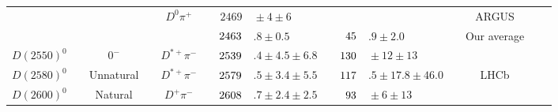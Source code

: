 \begin{adjustbox}{width=0.76\textwidth,center}
{\begin{tabular}{cp{5pt}cp{5pt}cp{5pt}r@{}lp{5pt}r@{}lp{5pt}cp{5pt}c}
		                                         &                  &                              &                  & $D^{0}\pi^{+}$                  &                       & $	2469$                       & ${}\pm4\pm6	$                                 &                       &                                                  &                                              &                       & ARGUS                                                         &                       & \cite{Albrecht:1989gb}                    \\ \cmidrule{6-14}
		                                         &                  &                              &                  &                                 & \cellcolor{Gray}      & $	\cellcolor{Gray} 2463$      & \cellcolor{Gray}$.8 \pm 0.5	$                 & \cellcolor{Gray}      & $	\cellcolor{Gray}45$                            & \cellcolor{Gray}$.9 \pm 2.0	$                & \cellcolor{Gray}      & \cellcolor{Gray} Our average                                  & \cellcolor{Gray}      &                                           \\ \midrule
		\multirow{1}{*}{$D(2550)^{0}$}           &                  & \multirow{1}{*}{$0^{-}$}     &                  & $D^{*+}\pi^{-}$                 & \cellcolor{LightGray} & $	\cellcolor{LightGray}2539$  & \cellcolor{LightGray}$.4\pm4.5\pm6.8	$        & \cellcolor{LightGray} & $	\cellcolor{LightGray}130$                      & \cellcolor{LightGray}${}\pm12\pm13	$         & \cellcolor{LightGray} & \cellcolor{LightGray} \babar{}                                & \cellcolor{LightGray} & \cite{delAmoSanchez:2010vq}               \\ \midrule
		\multirow{1}{*}{$D(2580)^{0}$}           &                  & \multirow{1}{*}{Unnatural}   &                  & $D^{*+}\pi^{-}$                 & \cellcolor{LightGray} & $	\cellcolor{LightGray}2579$  & \cellcolor{LightGray}$.5\pm3.4\pm5.5	$        & \cellcolor{LightGray} & $	\cellcolor{LightGray} 117$                     & \cellcolor{LightGray}$.5\pm17.8\pm46.0	$     & \cellcolor{LightGray} & \cellcolor{LightGray} LHCb                                    & \cellcolor{LightGray} & \cite{Aaij:2013sza}                       \\ \midrule
		\multirow{1}{*}{$D(2600)^{0}$}           &                  & \multirow{1}{*}{Natural}     &                  & $D^{+}\pi^{-}$                  & \cellcolor{LightGray} & $	\cellcolor{LightGray}2608$  & \cellcolor{LightGray}$.7\pm2.4\pm2.5	$        & \cellcolor{LightGray} & $	\cellcolor{LightGray} 93$                      & \cellcolor{LightGray}${}\pm6\pm13	$          & \cellcolor{LightGray} & \cellcolor{LightGray} \babar{}                                & \cellcolor{LightGray} & \cite{delAmoSanchez:2010vq}               \\ \midrule

\end{tabular}}
\end{adjustbox}
